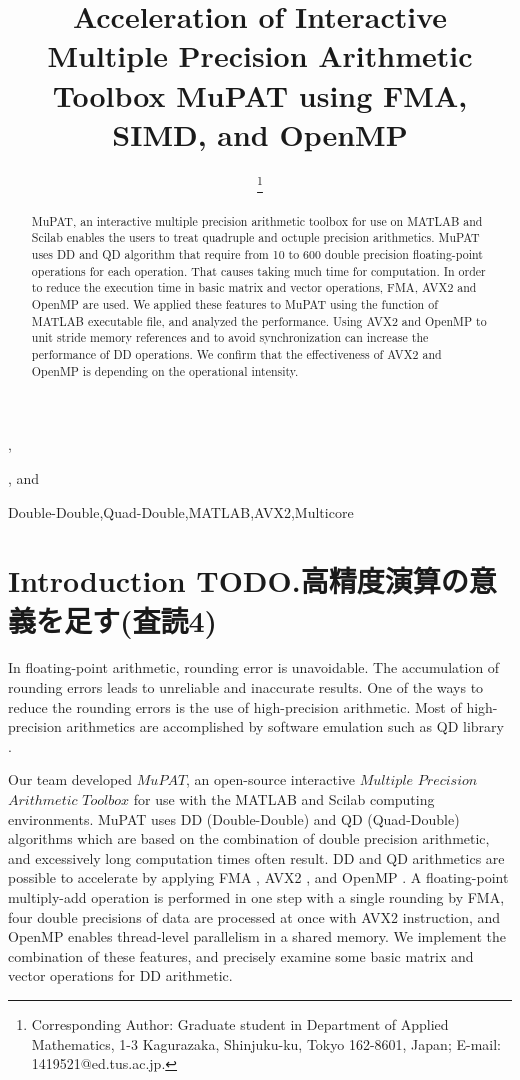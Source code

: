 \documentclass{IOS-Book-Article}
\begin{document}
\pagestyle{plain}

\begin{frontmatter} 
\title{ Acceleration of Interactive Multiple Precision Arithmetic Toolbox MuPAT using FMA,  SIMD, and OpenMP }
\author[A]{{ }
\thanks{Corresponding Author: Graduate student in Department of Applied Mathematics, 1-3 Kagurazaka, Shinjuku-ku, Tokyo 162-8601, Japan; E-mail: 1419521@ed.tus.ac.jp.}},
\author[A]{ },
 and 
\author[B]{  }

\address[A]{Tokyo University of Science, Japan}
\address[B]{ University of Tsukuba, Japan}

\begin{abstract}
MuPAT, an interactive multiple precision arithmetic toolbox for use on MATLAB and Scilab enables the users to treat quadruple and octuple precision arithmetics. MuPAT uses DD and QD algorithm that require from 10 to 600 double precision floating-point operations for each operation. That causes taking much time for computation. In order to reduce the execution time in basic matrix and vector operations, FMA, AVX2 and OpenMP are used. We applied these features to MuPAT using the function of MATLAB executable file, and analyzed the performance. Using AVX2 and OpenMP to unit stride memory references and to avoid synchronization can increase the performance of DD operations. We confirm that the effectiveness of AVX2 and OpenMP is depending on the operational intensity. 
\end{abstract}
\begin{keyword}
Double-Double\sep Quad-Double\sep MATLAB\sep  AVX2\sep Multicore
\end{keyword}
\end{frontmatter}
\section{Introduction TODO.高精度演算の意義を足す(査読4)}

In floating-point arithmetic, rounding error is unavoidable. The accumulation of rounding errors leads to unreliable and inaccurate results. One of the ways to reduce the rounding errors is the use of high-precision arithmetic.  
Most of high-precision arithmetics are accomplished by software emulation such as QD library \cite{QD}. 

Our team developed $MuPAT$, an open-source interactive $Multiple$ $Precision$ $Arithmetic$ $Toolbox$ \cite{saito, hota} for use with the MATLAB and Scilab computing environments. MuPAT uses DD (Double-Double) \cite{DD} and QD (Quad-Double) \cite{QD,DD} algorithms which are based on the combination of double precision arithmetic, and excessively long computation times often result. 
DD and QD arithmetics are possible to accelerate by applying FMA \cite{SIMD}, AVX2 \cite{SIMD}, and OpenMP \cite{omp}. A floating-point multiply-add operation is performed in one step with a single rounding by FMA, four double precisions of data are processed at once with AVX2 instruction, and OpenMP enables thread-level parallelism in a shared memory. 
We implement the combination of these features, and precisely examine some basic matrix and vector operations for DD arithmetic. 
\end{document}
